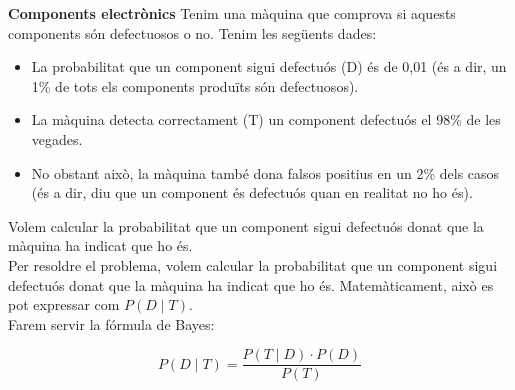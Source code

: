 \documentclass[12pt]{article}
\begin{document}
\begin{exemple} [title=Exemple 3] \noindent 
\textbf{Components electrònics}
Tenim una màquina que comprova si aquests components són defectuosos o no. Tenim les següents dades:

\begin{itemize}
    \item La probabilitat que un component sigui defectuós (D) és de 0,01 (és a dir, un 1\% de tots els components produïts són defectuosos).
    \item La màquina detecta correctament (T) un component defectuós el 98\% de les vegades.
    \item No obstant això, la màquina també dona falsos positius en un 2\% dels casos (és a dir, diu que un component és defectuós quan en realitat no ho és).
\end{itemize}

Volem calcular la probabilitat que un component sigui defectuós donat que la màquina ha indicat que ho és.\\

Per resoldre el problema, volem calcular la probabilitat que un component sigui defectuós donat que la màquina ha indicat que ho és. Matemàticament, això es pot expressar com $P(D \mid T)$.\\

Farem servir la fórmula de Bayes:

\[
P(D \mid T) = \frac{P(T \mid D) \cdot P(D)}{P(T)}
\]
\end{exemple}
\end{document}
